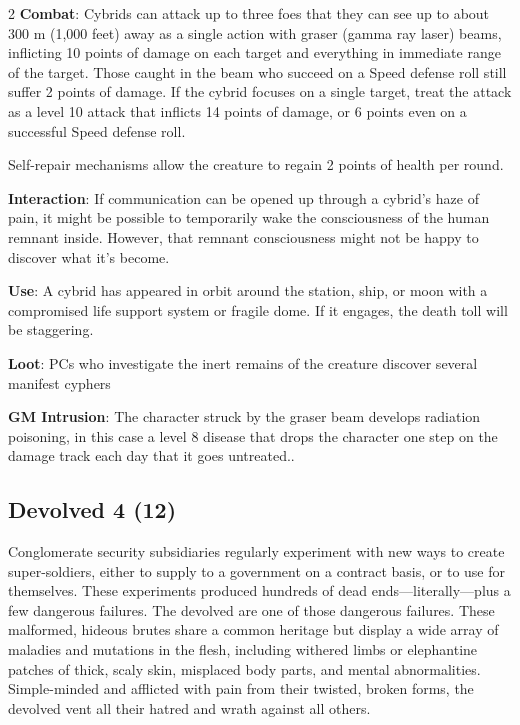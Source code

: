 \begin{multicols}{2}
\textbf{Combat}: Cybrids can attack up to three foes that they can see up to about 300 m (1,000 feet) away as a single action with graser (gamma ray laser) beams, inflicting 10 points of damage on each target and everything in immediate range of the target. Those caught in the beam who succeed on a Speed defense roll still suffer 2 points of damage. If the cybrid focuses on a single target, treat the attack as a level 10 attack that inflicts 14 points of damage, or 6 points even on a successful Speed defense roll.

Self-repair mechanisms allow the creature to regain 2 points of health per round. 

\textbf{Interaction}: If communication can be opened up through a cybrid’s haze of pain, it might be possible to temporarily wake the consciousness of the human remnant inside. However, that remnant consciousness might not be happy to discover what it’s become. 

\textbf{Use}: A cybrid has appeared in orbit around the station, ship, or moon with a compromised life support system or fragile dome. If it engages, the death toll will be staggering. 

\textbf{Loot}: PCs who investigate the inert remains of the creature discover several manifest cyphers

\textbf{GM Intrusion}: The character struck by the graser beam develops radiation poisoning, in this case a level 8 disease that drops the character one step on the damage track each day that it goes untreated..

\subsection{Devolved 4 (12)}

Conglomerate security subsidiaries regularly experiment with new ways to create super-soldiers, either to supply to a government on a contract basis, or to use for themselves. These experiments produced hundreds of dead ends—literally—plus a few dangerous failures. The devolved are one of those dangerous failures. These malformed, hideous brutes share a common heritage but display a wide array of maladies and mutations in the flesh, including withered limbs or elephantine patches of thick, scaly skin, misplaced body parts, and mental abnormalities. Simple-minded and afflicted with pain from their twisted, broken forms, the devolved vent all their hatred and wrath against all others. 


\end{multicols}
